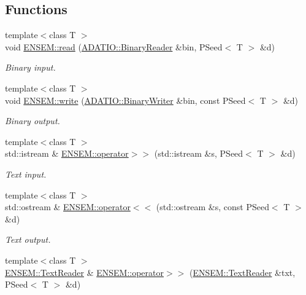 \subsection*{Functions}
\begin{DoxyCompactItemize}
\item 
{\footnotesize template$<$class T $>$ }\\void \mbox{\hyperlink{group__primseed_ga89a527bfdc043ff49f07e44a2fbb7a90}{E\+N\+S\+E\+M\+::read}} (\mbox{\hyperlink{classADATIO_1_1BinaryReader}{A\+D\+A\+T\+I\+O\+::\+Binary\+Reader}} \&bin, P\+Seed$<$ T $>$ \&d)
\begin{DoxyCompactList}\small\item\em Binary input. \end{DoxyCompactList}\item 
{\footnotesize template$<$class T $>$ }\\void \mbox{\hyperlink{group__primseed_gab778cd144e6a01cdbab68adedc21d456}{E\+N\+S\+E\+M\+::write}} (\mbox{\hyperlink{classADATIO_1_1BinaryWriter}{A\+D\+A\+T\+I\+O\+::\+Binary\+Writer}} \&bin, const P\+Seed$<$ T $>$ \&d)
\begin{DoxyCompactList}\small\item\em Binary output. \end{DoxyCompactList}\item 
{\footnotesize template$<$class T $>$ }\\std\+::istream \& \mbox{\hyperlink{group__primseed_gaab9d3da69048030afda4583bcd687578}{E\+N\+S\+E\+M\+::operator$>$$>$}} (std\+::istream \&s, P\+Seed$<$ T $>$ \&d)
\begin{DoxyCompactList}\small\item\em Text input. \end{DoxyCompactList}\item 
{\footnotesize template$<$class T $>$ }\\std\+::ostream \& \mbox{\hyperlink{group__primseed_ga63a0cabc9de5d7af797139dcbe08c7eb}{E\+N\+S\+E\+M\+::operator$<$$<$}} (std\+::ostream \&s, const P\+Seed$<$ T $>$ \&d)
\begin{DoxyCompactList}\small\item\em Text output. \end{DoxyCompactList}\item 
{\footnotesize template$<$class T $>$ }\\\mbox{\hyperlink{classENSEM_1_1TextReader}{E\+N\+S\+E\+M\+::\+Text\+Reader}} \& \mbox{\hyperlink{group__primseed_ga1ab70381c53bf81dbfeced414a44a1d5}{E\+N\+S\+E\+M\+::operator$>$$>$}} (\mbox{\hyperlink{classENSEM_1_1TextReader}{E\+N\+S\+E\+M\+::\+Text\+Reader}} \&txt, P\+Seed$<$ T $>$ \&d)

\end{DoxyCompactItemize}
